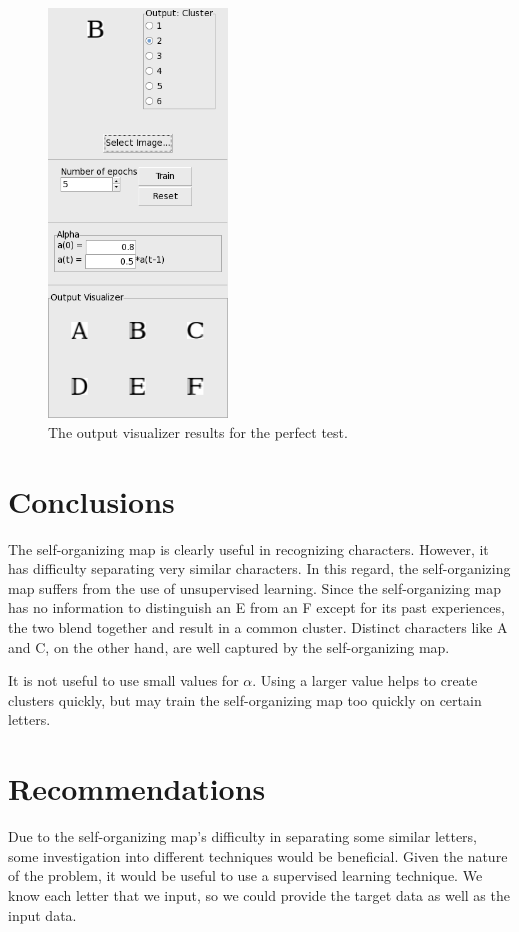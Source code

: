\documentclass[12pt,letterpaper,oneside]{report}
\newcommand \arfa{$\alpha$}
\begin{document}
\begin{figure}[ht]
  \centering
  \includegraphics[width=180px]{diagrams/perfect-test.png} 
  \caption{The output visualizer results for the perfect test.}
  \label{fig:perfect-test}
\end{figure}

\section{Conclusions}
The self-organizing map is clearly useful in recognizing characters. However, it has difficulty separating very similar characters. In this regard, the self-organizing map suffers from the use of unsupervised learning. Since the self-organizing map has no information to distinguish an E from an F except for its past experiences, the two blend together and result in a common cluster. Distinct characters like A and C, on the other hand, are well captured by the self-organizing map. 

It is not useful to use small values for \arfa. Using a larger value helps to create clusters quickly, but may train the self-organizing map too quickly on certain letters.

\section{Recommendations}
Due to the self-organizing map's difficulty in separating some similar letters, some investigation into different techniques would be beneficial. Given the nature of the problem, it would be useful to use a supervised learning technique. We know each letter that we input, so we could provide the target data as well as the input data.
\end{document}
